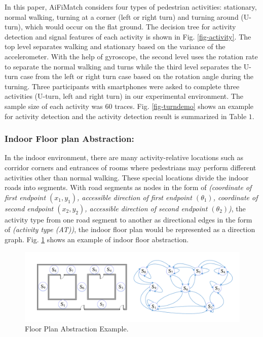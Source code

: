 \documentclass{llncs}
\begin{document}
In this paper, AiFiMatch considers four types of pedestrian activities: stationary, normal walking, turning at a corner (left or right turn) and turning around (U-turn), which would occur on the flat ground. The decision tree for activity detection and signal features of each activity is shown in Fig. \ref{fig-activity}. The top level separates walking and stationary based on the variance of the accelerometer. With the help of gyroscope, the second level uses the rotation rate to separate the normal walking and turns while the third level separates the U-turn case from the left or right turn case based on the rotation angle during the turning. Three participants with smartphones were asked to complete three activities (U-turn, left and right turn) in our experimental environment. The sample size of each activity was $60$ traces. Fig. \ref{fig-turndemo} shows an example for activity detection and the activity detection result is summarized in Table $1$.

\subsubsection{Indoor Floor plan Abstraction:}

In the indoor environment, there are many activity-relative locations such as corridor corners and entrances of rooms where pedestrians may perform different activities other than normal walking. These special locations divide the indoor roads into segments. With road segments as nodes in the form of \emph{(coordinate of first endpoint $(x_1,y_1)$, accessible direction of first endpoint $({\theta}_1)$, coordinate of second endpoint $(x_2,y_2)$, accessible direction of second endpoint $({\theta}_2)$)}, the activity type from one road segment to another as directional edges in the form of \emph{(activity type (AT))}, the indoor floor plan would be represented as a direction graph. Fig. \ref{fig-abstract} shows an example of indoor floor abstraction. 

\begin{figure}[!htbp]
	\centering
	\includegraphics[width=4.576in]{AiFiMatch-MapAbstract}
	\caption{Floor Plan Abstraction Example.}
	\label{fig-abstract}
\end{figure}
\end{document}

